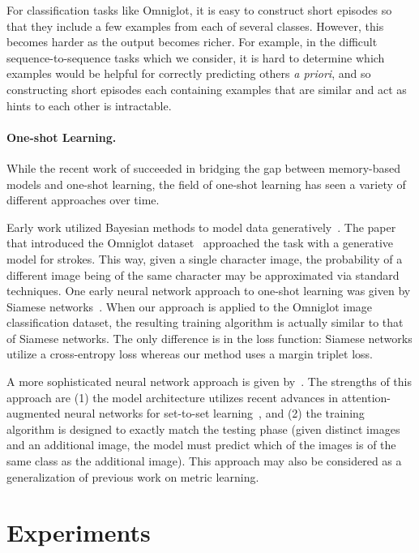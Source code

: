 \documentclass{article} \usepackage{iclr2017_conference,times}
\begin{document}
For classification tasks
like Omniglot, it is easy to construct short episodes so that they include
a few examples from each of several classes.  However, this becomes harder as 
the output becomes richer.  For example, in the difficult
sequence-to-sequence tasks which we consider,
it is hard to determine which examples would be helpful for correctly 
predicting others \emph{a priori}, and so constructing short episodes each 
containing examples that are similar and act as hints to each other is intractable.


\paragraph{One-shot Learning.}
While the recent work of \citet{santoro16} succeeded in bridging the gap between
memory-based models and one-shot learning, the field of one-shot learning
has seen a variety of different approaches over time.

Early work utilized Bayesian methods to model data generatively~\citep{feifei, oneshot}.
The paper that introduced the Omniglot dataset~\citep{oneshot} approached 
the task with a generative model for strokes.  This way, given a
single character image, the probability of a different image
being of the same character may be approximated via standard techniques.
One early neural network approach to one-shot learning was given by Siamese networks~\citep{siamese}.
When our approach is applied to the Omniglot image classification dataset, 
the resulting training algorithm is actually similar to that of Siamese networks.  
The only difference is in the loss function: Siamese networks utilize a
cross-entropy loss whereas our method uses a margin triplet loss.

A more sophisticated neural network approach is given by~\citet{matching}.
The strengths of this approach are (1) the model architecture utilizes
recent advances in attention-augmented neural networks for set-to-set
learning~\citep{set2set}, and (2) the training algorithm is designed
to exactly match the testing phase (given  distinct images and an
additional image, the model must predict which of the  images 
is of the same class as the additional image).
This approach may also be considered as a generalization of previous work
on metric learning.


\section{Experiments}
\end{document}
